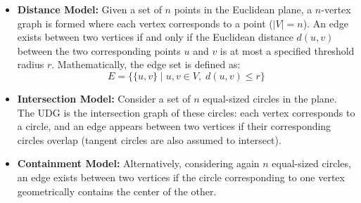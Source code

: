 \begin{itemize}
    \item \textbf{Distance Model:} Given a set of $n$ points in the Euclidean plane, a $n$-vertex graph is formed where each vertex corresponds to a point ($|V| = n$). An edge exists between two vertices if and only if the Euclidean distance $d(u, v)$ between the two corresponding points $u$ and $v$ is at most a specified threshold radius $r$. Mathematically, the edge set is defined as:
    \begin{equation}
        E = \{ \{u, v\} \mid u, v \in V, \; d(u, v) \leq r \}
    \end{equation}
    \item \textbf{Intersection Model:} Consider a set of $n$ equal-sized circles in the plane. The UDG is the intersection graph of these circles: each vertex corresponds to a circle, and an edge appears between two vertices if their corresponding circles overlap (tangent circles are also assumed to intersect).
    \item \textbf{Containment Model:} Alternatively, considering again $n$ equal-sized circles, an edge exists between two vertices if the circle corresponding to one vertex geometrically contains the center of the other.
\end{itemize}

